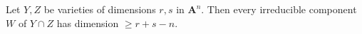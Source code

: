 Let $Y, Z$ be varieties of dimensions $r, s$ in $\mathbf{A}^n$. Then every irreducible component $W$ of $Y \cap Z$ has dimension $\geq r + s - n$.
